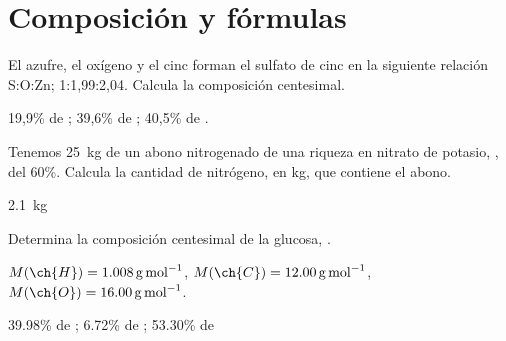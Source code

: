 \section{Composición y fórmulas}

\begin{exercise}[
    tags    = {termodinámica, entalpía, entalpia de reacción, calor},
    topics  = {química, termoquímica, termodinámica},
    source  = {FQ 1B OXF 2015, p43, e40},
  ]
  El azufre, el oxígeno y el cinc forman el sulfato de cinc en la siguiente relación S:O:Zn; 1:1,99:2,04. Calcula la composición centesimal.
\end{exercise}

\begin{solution}
  19,9\% de ; 39,6\% de ; 40,5\% de .
\end{solution}




\begin{exercise}[
    tags    = {termodinámica, entalpía, entalpia de reacción, calor},
    topics  = {química, termoquímica, termodinámica},
    source  = {FQ 1B OXF 2015, p43, e41},
  ]
  Tenemos \SI{25}{\kilo\gram} de un abono nitrogenado de una riqueza en nitrato de potasio, , del 60\%. Calcula la cantidad de nitrógeno, en \si{\kilo\gram}, que contiene el abono.
\end{exercise}

\begin{solution}
  \SI{2.1}{\kilo\gram}
\end{solution}



\begin{exercise}[
    tags    = {termodinámica, entalpía, entalpia de reacción, calor},
    topics  = {química, termoquímica, termodinámica},
    source  = {FQ 1B SAN 2015, p43, e43},
  ]
  Determina la composición centesimal de la glucosa, .

  \begin{gexdatos}
    \( M(\ch{H}) = \SI{1.008}{\gram\per\mole} \),
    \( M(\ch{C}) = \SI{12.00}{\gram\per\mole} \),
    \( M(\ch{O}) = \SI{16.00}{\gram\per\mole} \).
  \end{gexdatos}
\end{exercise}

\begin{solution}
  39.98\% de ; 6.72\% de ; 53.30\% de 
\end{solution}




